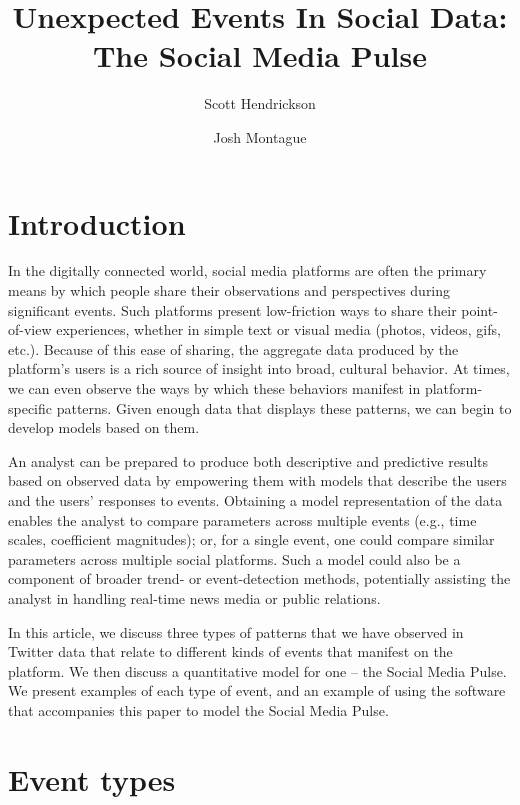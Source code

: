 \documentclass{article}
\title{Unexpected Events In Social Data: The Social Media Pulse}
\author[]{Scott Hendrickson}
\author[]{Josh Montague}
\affil[]{Twitter, Inc.}
\begin{document}
\maketitle

\section{Introduction}
\label{sec:intro}

In the digitally connected world, social media platforms are often the primary means by which people share their observations and perspectives during significant events. Such platforms present low-friction ways to share their point-of-view experiences, whether in simple text or visual media (photos, videos, gifs, etc.). Because of this ease of sharing, the aggregate data produced by the platform's users is a rich source of insight into broad, cultural behavior. At times, we can even observe the ways by which these behaviors manifest in platform-specific patterns. Given enough data that displays these patterns, we can begin to develop models based on them.   

An analyst can be prepared to produce both descriptive and predictive results based on observed data by empowering them with models that describe the users and the users' responses to events. Obtaining a model representation of the data enables the analyst to compare parameters across multiple events (e.g., time scales, coefficient magnitudes); or, for a single event, one could compare similar parameters across multiple social platforms. Such a model could also be a component of broader trend- or event-detection methods, potentially assisting the analyst in handling real-time news media or public relations. 

In this article, we discuss three types of patterns that we have observed in Twitter data that relate to different kinds of events that manifest on the platform. We then discuss a quantitative model for one -- the Social Media Pulse. We present examples of each type of event, and an example of using the software that accompanies this paper to model the Social Media Pulse.\cite{pulse}


\section{Event types}
\label{sec:models}
\end{document}
